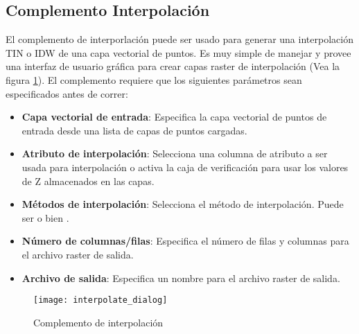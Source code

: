 
\subsection{Complemento Interpolaci\'on}


El complemento de interporlaci\'on puede ser usado para generar una interpolaci\'on TIN o IDW de una 
capa vectorial de puntos. Es muy simple de manejar y provee una interfaz de usuario gr\'afica 
para crear capas raster de interpolaci\'on (Vea la figura \ref{fig:interpolation_dialog}).
El complemento requiere que los siguientes par\'ametros sean especificados antes de correr:

\begin{itemize}
\item \textbf{Capa vectorial de entrada}: Especifica la capa vectorial de puntos de entrada desde una lista de capas de puntos cargadas.
\item \textbf{Atributo de interpolaci\'on}: Selecciona una columna de atributo a ser usada para interpolaci\'on o 
activa la caja de verificaci\'on  para usar los valores de Z almacenados en las capas.
\item \textbf{M\'etodos de interpolaci\'on}: Selecciona el m\'etodo de interpolaci\'on. Puede ser  o bien .
\item \textbf{N\'umero de columnas/filas}: Especifica el n\'umero de filas y columnas para el archivo raster de salida.
\item \textbf{Archivo de salida}: Especifica un nombre para el archivo raster de salida.
\end{itemize}

\begin{figure}[ht]
   \begin{center}
   \caption{Complemento de interpolaci\'on \nixcaption}\label{fig:interpolation_dialog}\smallskip
   \texttt{[image: interpolate\_dialog]}
\end{center}  
\end{figure}

\label{interpolation_usage}

